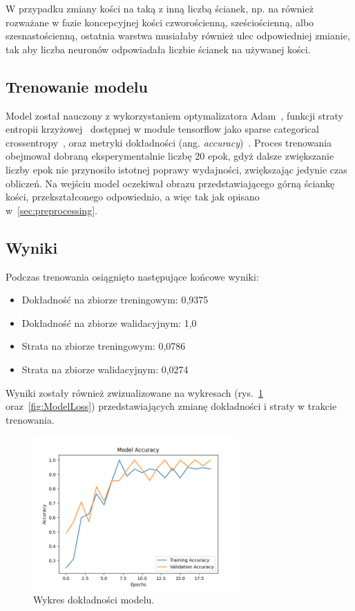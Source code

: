 W przypadku zmiany kości na taką z inną liczbą ścianek, np.
na również rozważane w fazie koncepcyjnej kości czworościenną, sześciościenną, albo szesnastościenną,
ostatnia warstwa musiałaby również ulec odpowiedniej zmianie,
tak aby liczba neuronów odpowiadała liczbie ścianek na używanej kości.

\subsection{Trenowanie modelu}\label{subsec:trenowanie-modelu}

Model został nauczony z wykorzystaniem optymalizatora Adam~\cite{kingma2014adam, keras_adam},
funkcji straty entropii krzyżowej~\cite{crossentropy} dostępnej w module tensorflow jako sparse categorical crossentropy~\cite{tensorflow_loss},
oraz metryki dokładności (ang. \textit{accuracy})~\cite{tensorflow_accuracy}.
Proces trenowania obejmował dobraną eksperymentalnie liczbę 20 epok, gdyż dalsze zwiększanie liczby epok nie przynosiło istotnej poprawy wydajności, zwiększając jedynie czas obliczeń.
Na wejściu model oczekiwał obrazu przedstawiającego górną ściankę kości, przekształconego odpowiednio, a więc tak jak opisano w~\ref{sec:preprocessing}.


\subsection{Wyniki}\label{subsec:wyniki}

Podczas trenowania osiągnięto następujące końcowe wyniki:

\begin{itemize}
    \item Dokładność na zbiorze treningowym: 0,9375
    \item Dokładność na zbiorze walidacyjnym: 1,0
    \item Strata na zbiorze treningowym: 0,0786
    \item Strata na zbiorze walidacyjnym: 0,0274
\end{itemize}

Wyniki zostały również zwizualizowane na wykresach (rys.~\ref{fig:ModelAcc} oraz~\ref{fig:ModelLoss})
przedstawiających zmianę dokładności i straty w trakcie trenowania.

\begin{figure}[H]
    \centering
    \includegraphics[width=0.7\textwidth]{chapters/04-czytanie/figures/ModelAcc1}
    \caption{Wykres dokładności modelu.}
    \label{fig:ModelAcc}
\end{figure}

